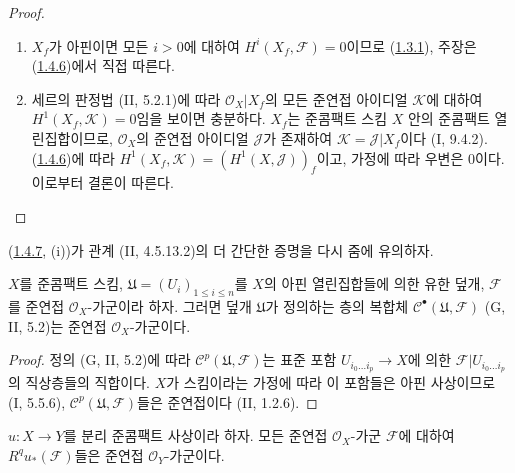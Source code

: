 \begin{proof}
\begin{enumerate}
\item[(i)] $X_f$가 아핀이면 모든 $i>0$에 대하여
$H^i(X_f,\mathcal F)=0$이므로
(\hyperref[III.1.3.1-fr]{1.3.1}), 주장은
(\hyperref[III.1.4.6-fr]{1.4.6})에서 직접 따른다.
\item[(ii)] 세르의 판정법 (II, 5.2.1)에 따라
$\mathcal O_X\vert X_f$의 모든 준연접 아이디얼 $\mathcal K$에 대하여
$H^1(X_f,\mathcal K)=0$임을 보이면 충분하다. $X_f$는 준콤팩트 스킴
$X$ 안의 준콤팩트 열린집합이므로, $\mathcal O_X$의 준연접 아이디얼
$\mathcal J$가 존재하여 $\mathcal K=\mathcal J\vert X_f$이다
(I, 9.4.2). (\hyperref[III.1.4.6-fr]{1.4.6})에 따라
$H^1(X_f,\mathcal K)=(H^1(X,\mathcal J))_f$이고, 가정에 따라 우변은
0이다. 이로부터 결론이 따른다.
\end{enumerate}
\end{proof}

\begin{remark}[1.4.8]
\label{III.1.4.8-fr}
(\hyperref[III.1.4.7-fr]{1.4.7}, (i))가 관계 (II, 4.5.13.2)의 더
간단한 증명을 다시 줌에 유의하자.
\end{remark}

\begin{lemma}[1.4.9]
\label{III.1.4.9-fr}
$X$를 준콤팩트 스킴,
$\mathfrak U=(U_i)_{1\leq i\leq n}$를 $X$의 아핀 열린집합들에 의한
유한 덮개, $\mathcal F$를 준연접 $\mathcal O_X$-가군이라 하자.
그러면 덮개 $\mathfrak U$가 정의하는 층의 복합체
$\mathcal C^\bullet(\mathfrak U,\mathcal F)$ (G, II, 5.2)는 준연접
$\mathcal O_X$-가군이다.
\end{lemma}

\begin{proof}
정의 (G, II, 5.2)에 따라
$\mathcal C^p(\mathfrak U,\mathcal F)$는 표준 포함
$U_{i_0\ldots i_p}\to X$에 의한
$\mathcal F\vert U_{i_0\ldots i_p}$의 직상층들의 직합이다. $X$가
스킴이라는 가정에 따라 이 포함들은 아핀 사상이므로 (I, 5.5.6),
$\mathcal C^p(\mathfrak U,\mathcal F)$들은 준연접이다 (II, 1.2.6).
\end{proof}

\begin{proposition}[1.4.10]
\label{III.1.4.10-fr}
$u:X\to Y$를 분리 준콤팩트 사상이라 하자. 모든 준연접
$\mathcal O_X$-가군 $\mathcal F$에 대하여
$R^qu_*(\mathcal F)$들은 준연접 $\mathcal O_Y$-가군이다.
\end{proposition}

